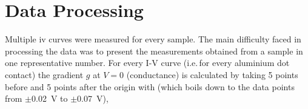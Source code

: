 \section{Data Processing}
\label{sec:eval}
Multiple \gls{iv} curves were measured for every sample.
The main difficulty faced in processing the data was to present the measurements obtained 
from a sample in one representative number. 
%
%
For every I-V curve (i.e.\,for every aluminium dot contact) the gradient $g$ at $V=0$ (conductance) is calculated by taking 
5 points before and 5 points after the origin with  (which boils
down to the data points from $\pm$\SI{0.02}{\volt} to $\pm$\SI{0.07}{\volt}), 
